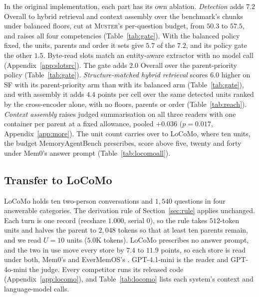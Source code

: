 \documentclass{article}
\newcommand{\sys}{\textsc{Muster}}
\newcommand{\serial}{\textsf{serial}}
\newcommand{\cov}{\textsf{recshare}}
\begin{document}
In the original implementation, each part has its own ablation. \emph{Detection} adds $7.2$ Overall to hybrid retrieval and context assembly over the benchmark's chunks under balanced floors, cut at \sys{}'s per-question budget, from $50.3$ to $57.5$, and raises all four competencies (Table~\ref{tab:gate}). With the balanced policy fixed, the units, parents and order it sets give $5.7$ of the $7.2$, and its policy gate the other $1.5$. Byte-read slots match an entity-aware extractor with no model call (Appendix~\ref{app:slotsrc}). The gate adds $2.0$ Overall over the parent-priority policy (Table~\ref{tab:gate}). \emph{Structure-matched hybrid retrieval} scores $6.0$ higher on SF with its parent-priority arm than with its balanced arm (Table~\ref{tab:gate}), and with assembly it adds $4.4$ points per cell over the same detected units ranked by the cross-encoder alone, with no floors, parents or order (Table~\ref{tab:reach}). \emph{Context assembly} raises judged summarisation on all three readers with one container per parent at a fixed allowance, pooled $+0.036$ ($p=0.017$, Appendix~\ref{app:more}). The unit count carries over to LoCoMo, where ten units, the budget MemoryAgentBench prescribes, score above five, twenty and forty under Mem0's answer prompt (Table~\ref{tab:locomoall}).

\subsection{Transfer to LoCoMo}\label{sec:locomo}

LoCoMo \cite{locomo} holds ten two-person conversations and $1{,}540$ questions in four answerable categories. The derivation rule of Section~\ref{sec:rule} applies unchanged. Each turn is one record (\cov{} $1.000$, \serial{} $0$), so the rule takes $512$-token units and halves the parent to $2{,}048$ tokens so that at least ten parents remain, and we read $U{=}10$ units ($5.0$K tokens). LoCoMo prescribes no answer prompt, and the two in use move every store by $7.4$ to $11.9$ points, so each store is read under both, Mem0's \cite{mem0} and EverMemOS's \cite{evermemos}. GPT-4.1-mini \cite{gpt41} is the reader and GPT-4o-mini \cite{gpt4omini} the judge. Every competitor runs its released code (Appendix~\ref{app:locomo}), and Table~\ref{tab:locomo} lists each system's context and language-model calls.
\end{document}

